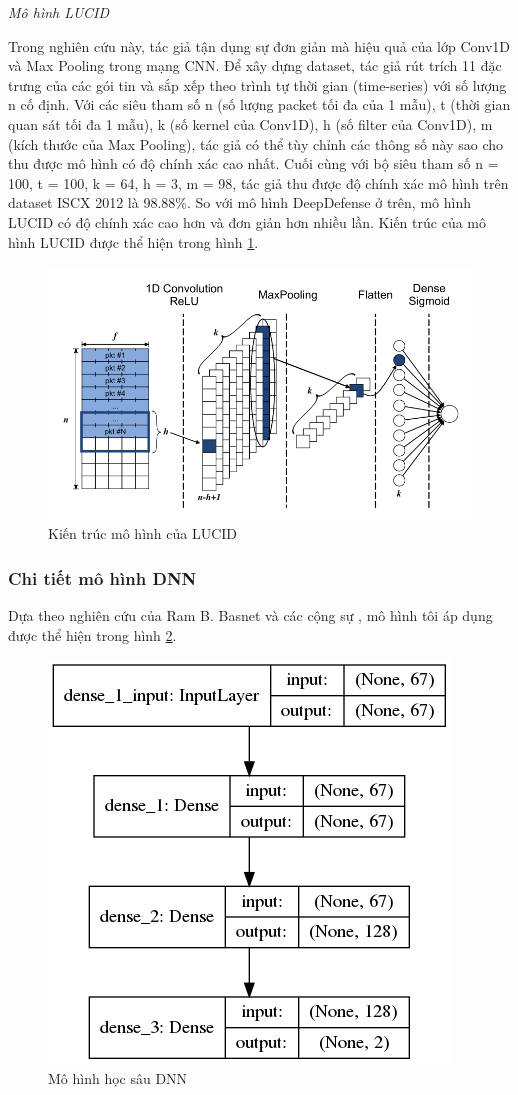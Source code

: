 \textit{Mô hình LUCID}\cite{27-Corin}

Trong nghiên cứu này, tác giả tận dụng sự đơn giản mà hiệu quả của lớp Conv1D và Max  Pooling trong mạng CNN. Để xây dựng dataset, tác giả rút trích 11 đặc trưng của các gói tin và sắp xếp theo trình tự thời gian (time-series) với số lượng n cố định. Với các siêu tham số n (số lượng packet tối đa của 1 mẫu), t (thời gian quan sát tối đa 1 mẫu), k (số kernel của Conv1D), h (số filter của Conv1D), m (kích thước của Max Pooling), tác giả có thể tùy chỉnh các thông số này sao cho thu được mô hình có độ chính xác cao nhất. Cuối cùng với bộ siêu tham số n = 100, t = 100, k = 64, h = 3, m = 98, tác giả thu được độ chính xác mô hình trên dataset ISCX 2012 \cite{35-Shiravi} là 98.88\%. So với mô hình DeepDefense ở trên, mô hình LUCID có độ chính xác cao hơn và  đơn giản hơn nhiều lần. Kiến trúc của mô hình LUCID được thể hiện trong hình \ref{fig:lucid-model}.

\begin{figure}[ht!]
	\centering
	\includegraphics[width=0.6\linewidth]{fig/lucid-model.png}
	\caption{Kiến trúc mô hình của LUCID \cite{27-Corin}}
	\label{fig:lucid-model}
\end{figure}

\subsubsection{Chi tiết mô hình DNN}

Dựa theo nghiên cứu của Ram B. Basnet và các cộng sự \cite{61-Basnet}, mô hình tôi áp dụng được thể hiện trong hình \ref{fig:dnn-model}.

 \begin{figure}[ht!]
 	\centering
	\includegraphics[width=0.5\linewidth]{fig/dnn-model.png}
	\caption{Mô hình học sâu DNN}
	\label{fig:dnn-model}
\end{figure}

